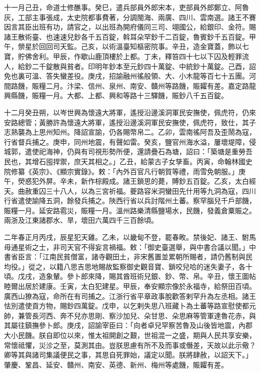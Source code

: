 \begin{pinyinscope}
 十一月己丑，命道士修醮事。癸巳，遣兵部員外郎宋本，吏部員外郎鄭立、阿魯灰，工部主事張成，太史院都事費著，分調閩海、兩廣、四川、雲南選。諸王不賽因言其臣出班有功，請官之，以出班為開府儀同三司、翊國公，給銀印、金符。賜諸王散術臺、也速速兒鈔各千五百錠，斡耳朵罕鈔千二百錠，魯賓鈔千五百錠。甲午，禜星於回回司天監。己亥，以術溫臺知樞密院事。辛丑，造金寶蓋，飾以七寶，貯佛舍利。甲辰，作歇山鹿頂樓於上都。丁未，釋笞四十七以下囚及輕罪流人，給鈔二千錠散與貧者。印明年鈔本至元鈔四十萬錠、中統鈔十萬錠。己酉，詔免也裏可溫、答失蠻差役。庚戌，招諭融州徭般領、大、小木龍等百七十五團。河間路饑，賑糧二月。汴梁、信州、泉州、南安、贛州等路饑，賑糶有差。嘉定路龍興縣饑，賑糧一月。大都、上都、興和等路十三驛饑，賑鈔八千五百錠。



 十二月癸丑朔，以岑世興為懷遠大將軍，遙授沿邊溪洞軍民安撫使，佩虎符，仍來安路總管；黃勝許為懷遠大將軍，遙授沿邊溪洞軍民安撫使，佩虎符，致仕，其子志熟襲為上思州知州。降詔宣諭，仍各賜幣帛二。乙卯，雲南徭阿吾及歪鬧為寇，行省督兵捕之。庚申，同州地震，有聲如雷。癸亥，鹽官州海水溢，屢壞堤障，侵城郭，遣使祀海神，仍與有司視形勢所便，還請疊石為塘，詔曰：「築塘是重勞吾民也，其增石囤捍禦，庶天其相之。」乙丑，給蒙古子女孳畜。丙寅，命翰林國史院修纂《英宗》、《顯宗實錄》。敕：「內外百官凡行朝賀等禮，雨雪免朝服。」庚午，熒惑犯外屏。辛未，新作棕殿成。諸王鎖思的薨，賻鈔五百錠。乙亥，太白經天。曲赦重囚三十八人，以為三宮祈福。夔路容米洞蠻田先什用等九洞為寇，四川行省遣使諭降五洞，餘發兵捕之。陜西行省以兵討階州土蕃。察罕腦兒千戶部饑，賑糧一月。延安路雹災，賑糧一月。溫州路樂清縣鹽場水，民饑，發義倉粟賑之。兩浙及江東諸郡水、旱，壞田六萬四千三百餘頃。



 二年春正月丙戌，辰星犯天雞。乙未，以畿甸不登，罷春畋。禁後妃、諸王、駙馬毋通星術之士，非司天官不得妄言禍福。敕：「御史臺選舉，與中書合議以聞。」中書省臣言：「江南民貧僧富，諸寺觀田土，非宋舊置並累朝所賜者，請仍舊制與民均役。」從之，以籍八思吉思地賜故監察御史觀音寶、鎖咬兒哈的迷失妻子，各十頃。戊戌，造象輦。參卜郎來降，賜其酋班術兒銀、鈔、幣、帛。辛丑，懷王圖帖睦爾出居於建康。壬寅，太白犯建星。甲辰，奉安顯宗像於永福寺，給祭田百頃。廣西山獠為寇，命所在有司捕之。江浙行省平章政事脫歡答剌罕升為左丞相。諸王怯別遣使貢方物，賜鈔四萬錠。戊申，以乞剌失思八班藏卜為土蕃等路宣慰使都元帥，兼管長河西、奔不兒亦思剛、察沙加兒、朵甘思、朵思麻等管軍達魯花赤，與其屬往鎮撫參卜郎。庚戌，詔諭宰臣曰：「向者卓兒罕察苦魯及山後皆地震，內郡大小民饑。朕自即位以來，惟太祖開創之艱，世祖混一之盛，期與人民共享安樂，常懷祗懼，災沴之至，莫測其由。豈朕思慮有所不及而事或僭差，天故以此示儆？卿等其與諸司集議便民之事，其思自死罪始，議定以聞。朕將肆赦，以詔天下。」肇慶、鞏昌、延安、贛州、南安、英德、新州、梅州等處饑，賑糶有差。




\end{pinyinscope}
